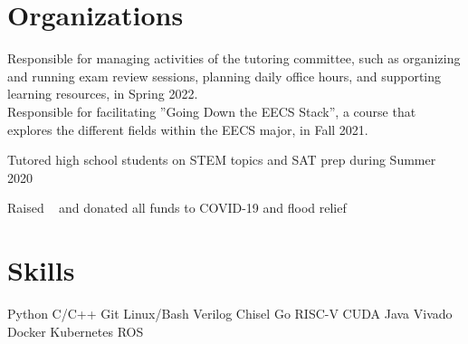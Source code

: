 \documentclass[]{deedy-resume-openfont}
\begin{document}
\section{Organizations}
\vspace{3pt}
{\normalsize
Responsible for managing activities of the tutoring committee, such as organizing and running exam review sessions, planning daily office hours, and supporting learning resources, in Spring 2022.
}
\\
\vspace{3pt}
{\normalsize
Responsible for facilitating ”Going Down
the EECS Stack”, a course that explores
the different fields within the EECS major, in Fall 2021.
}
\sectionsep


\vspace{3pt}
\begin{tightemize}
\item Tutored high school students on STEM topics and SAT prep during Summer 2020
\item Raised ~ and donated all funds to COVID-19 and flood relief
\end{tightemize}
\sectionsep

\section{Skills}
Python \textbullet{} C/C++ \textbullet{} Git \textbullet{} Linux/Bash \textbullet{} Verilog \textbullet{} Chisel \textbullet{} Go \textbullet{} RISC-V \textbullet{} CUDA \textbullet{} Java \textbullet{} Vivado \textbullet{} Docker \textbullet{} Kubernetes \textbullet{} ROS %
\sectionsep




\end{document}
